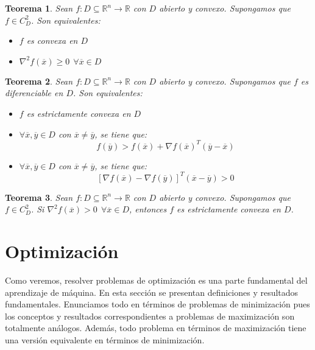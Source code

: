 \documentclass[11pt]{report}
\newtheorem{theorem}{Teorema}[section]
\newcommand{\Rn}{\mathbb{R}^{n}}
\newcommand{\R}{\mathbb{R}}
\newcommand{\x}{\overline{x}}
\newcommand{\y}{\overline{y}}
\begin{document}
\begin{theorem}
Sean $f:D\subseteq\Rn\rightarrow\R$ con $D$ abierto y convexo. Supongamos que $f\in C_{D}^{2}$. Son equivalentes:
\begin{itemize}
\item[(i)] $f$ es convexa en $D$
\item[(ii)] $\nabla^{2}f(\x)\geq0\ \ \forall\x\in D$
\end{itemize}
\end{theorem}

\begin{theorem}
Sean $f:D\subseteq\Rn\rightarrow\R$ con $D$ abierto y convexo. Supongamos que $f$ es diferenciable en $D$. Son equivalentes:
\begin{itemize}
\item[(i)] $f$ es estrictamente convexa en $D$
\item[(ii)] $\forall\x,\y\in D$ con $\x\ne\y$, se tiene que: $$f(\y)> f(\x)+\nabla f(\x)^{T}(\y - \x)$$
\item[(iii)] $\forall\x,\y\in D$ con $\x\ne\y$, se tiene que: $$[\nabla f(\x)-\nabla f(\y)]^{T}(\x-\y)>0$$
\end{itemize}
\end{theorem}

\begin{theorem}
Sean $f:D\subseteq\Rn\rightarrow\R$ con $D$ abierto y convexo. Supongamos que $f\in C_{D}^{2}$.
Si $\nabla^{2}f(\x)>0\ \ \forall\x\in D$, entonces $f$ es estrictamente convexa en $D$.
\end{theorem}
\chapter{Optimización}
Como veremos, resolver problemas de optimización  es una parte fundamental del aprendizaje de máquina. En esta sección se presentan definiciones y resultados fundamentales. Enunciamos todo en términos de problemas de minimización pues los conceptos y resultados correspondientes a problemas de maximización son totalmente análogos. Además, todo problema en términos de maximización tiene una versión equivalente en términos de minimización.
\end{document}
